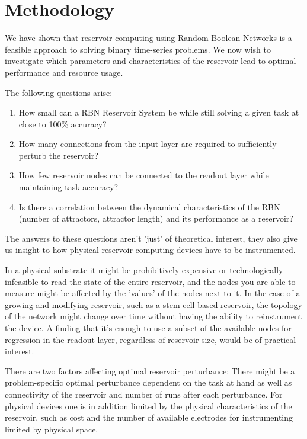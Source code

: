 \chapter{Methodology}

We have shown that reservoir computing using Random Boolean Networks is a feasible approach to solving binary time-series problems.
We now wish to investigate which parameters and characteristics of the reservoir lead to optimal performance and resource usage.

The following questions arise:

\begin{enumerate}
    \item How small can a RBN Reservoir System be while still solving a given task at close to 100\% accuracy?
    \item How many connections from the input layer are required to sufficiently perturb the reservoir?
    \item How few reservoir nodes can be connected to the readout layer while maintaining task accuracy?
    \item Is there a correlation between the dynamical characteristics of the RBN (number of attractors, attractor length) and its performance as a reservoir?
\end{enumerate}

The answers to these questions aren't 'just' of theoretical interest,
they also give us insight to how physical reservoir computing devices have to be instrumented.

In a physical substrate it might be prohibitively expensive or technologically infeasible to read the state of the entire reservoir,
and the nodes you are able to measure might be affected by the 'values' of the nodes next to it.
In the case of a growing and modifying reservoir, such as a stem-cell based reservoir,
the topology of the network might change over time without having the ability to reinstrument the device.
A finding that it's enough to use a subset of the available nodes for regression in the readout layer,
regardless of reservoir size, would be of practical interest.

There are two factors affecting optimal reservoir perturbance:
There might be a problem-specific optimal perturbance dependent on the task at hand as well as connectivity of the reservoir and number of runs after each perturbance.
For physical devices one is in addition limited by the physical characteristics of the reservoir,
such as cost and the number of available electrodes for instrumenting limited by physical space.

